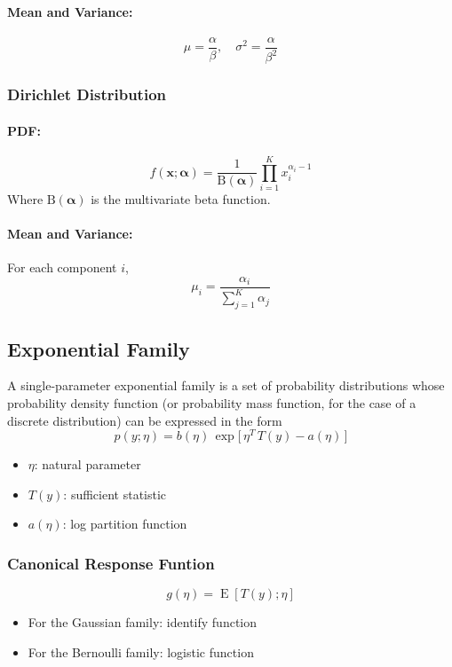 \documentclass[8pt, a4paper, landscape, includeheadfoot]{extarticle}
\begin{document}
\begin{multicols*}{4}
	\paragraph{Mean and Variance:}
	$$
		\mu = \frac{\alpha}{\beta}, \quad \sigma^2 = \frac{\alpha}{\beta^2}
	$$

	\subsubsection{Dirichlet Distribution}{}
	\paragraph{PDF:}
	$$
		f(\mathbf{x}; \boldsymbol{\alpha}) = \frac{1}{\mathrm{B}(\boldsymbol{\alpha})} \prod_{i=1}^{K} x_i^{\alpha_i - 1}
	$$
	Where $\mathrm{B}(\boldsymbol{\alpha})$ is the multivariate beta function.
	\paragraph{Mean and Variance:}
	For each component $i$,
	$$
		\mu_i = \frac{\alpha_i}{\sum_{j=1}^K \alpha_j}
	$$
	\subsection{Exponential Family}
	A single-parameter exponential family is a set of probability distributions
	whose probability density function (or probability mass function, for the case of a discrete distribution) can be expressed in the form
	$$
		p(y;\eta) = b(\eta)\,\exp\bigl[\,\eta^T \, T(y) - a(\eta)\,\bigr]
	$$
	\begin{itemize}[itemsep=0pt]
		\item $\eta$: natural parameter
		\item $T(y)$: sufficient statistic
		\item $a(\eta)$: log partition function
	\end{itemize}

	\subsubsection{Canonical Response Funtion}{}
	$$
		g(\eta) = \operatorname{E}[T(y);\eta]
	$$
	\begin{itemize}[itemsep=0pt]
		\item For the Gaussian family: identify function
		\item For the Bernoulli family: logistic function
	\end{itemize}


\end{multicols*}
\end{document}
